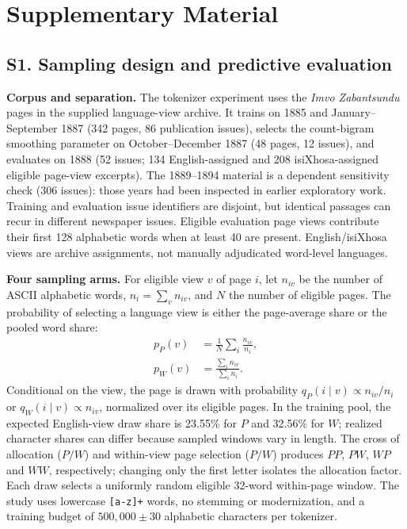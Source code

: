 \clearpage
\section*{Supplementary Material}

\subsection*{S1. Sampling design and predictive evaluation}
\noindent\textbf{Corpus and separation.}
The tokenizer experiment uses the \emph{Imvo Zabantsundu} pages in the supplied
language-view archive. It trains on 1885 and January--September 1887
(342 pages, 86 publication issues), selects the count-bigram smoothing
parameter on October--December 1887 (48 pages, 12 issues), and evaluates
on 1888 (52 issues; 134 English-assigned and 208 isiXhosa-assigned
eligible page-view excerpts). The 1889--1894 material is a dependent sensitivity check (306 issues):
those years had been inspected in earlier exploratory work. Training and evaluation
issue identifiers are disjoint, but identical passages can recur in
different newspaper issues. Eligible evaluation page views contribute their first 128 alphabetic
words when at least 40 are present. English/isiXhosa views are archive
assignments, not manually adjudicated word-level languages.

\noindent\textbf{Four sampling arms.}
For eligible view $v$ of page $i$, let $n_{iv}$ be the number of ASCII
alphabetic words, $n_i=\sum_v n_{iv}$, and $N$ the number of eligible
pages. The probability of selecting a language view is either the
page-average share or the pooled word share:
\begin{equation}
\begin{aligned}
p_P(v)&=\frac{1}{N}\sum_i\frac{n_{iv}}{n_i},\\
p_W(v)&=\frac{\sum_i n_{iv}}{\sum_i n_i}.
\end{aligned}
\end{equation}
Conditional on the view, the page is drawn with probability
$q_P(i\mid v)\propto n_{iv}/n_i$ or
$q_W(i\mid v)\propto n_{iv}$, normalized over its eligible pages.
In the training pool, the expected English-view draw share is
23.55\% for $P$ and 32.56\% for $W$; realized character shares can differ
because sampled windows vary in length.
The cross of allocation ($P/W$) and within-view page selection ($P/W$)
produces $PP$, $PW$, $WP$ and $WW$, respectively; changing only the first
letter isolates the allocation factor. Each draw selects a uniformly
random eligible 32-word within-page window. The study uses lowercase
\texttt{[a-z]+} words, no stemming or modernization, and a training
budget of $500{,}000\pm30$ alphabetic characters per tokenizer.

